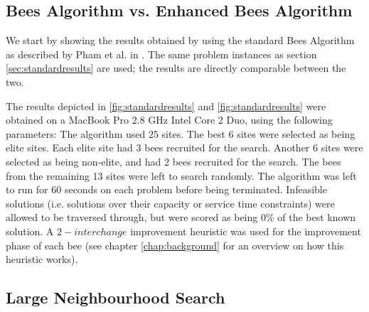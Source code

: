 \subsection{Bees Algorithm vs. Enhanced Bees Algorithm}
\label{subsec:bavebs}

We start by showing the results obtained by using the standard Bees Algorithm as described by Pham et al. in \cite{PGKORZ:2005}. The same problem instances as section \ref{sec:standardresults} are used; the results are directly comparable between the two.



The results depicted in \ref{fig:standardresults} and \ref{fig:standardresults} were obtained on a MacBook Pro 2.8 GHz Intel Core 2 Duo, using the following parameters: The algorithm used 25 sites. The best 6 sites were selected as being elite sites. Each elite site had 3 bees recruited for the search. Another 6 sites were selected as being non-elite, and had 2 bees recruited for the search. The bees from the remaining 13 sites were left to search randomly. The algorithm was left to run for 60 seconds on each problem before being terminated. Infeasible solutions (i.e. solutions over their capacity or service time constraints) were allowed to be traversed through, but were scored as being 0\% of the best known solution. A $2-interchange$ improvement heuristic was used for the improvement phase of each bee (see chapter \ref{chap:background} for an overview on how this heuristic works).

\subsection{Large Neighbourhood Search}
\label{subsec:largeneighbourhoodsearch}

